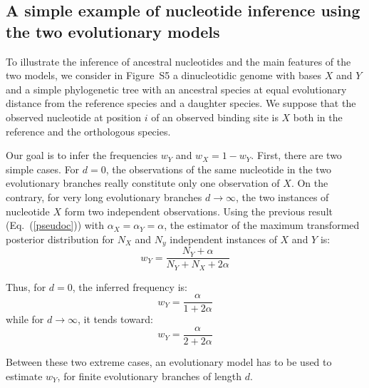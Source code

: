 \documentclass[a4,center,fleqn]{NAR}
\begin{document}
\subsection*{A simple example of nucleotide inference using the two
evolutionary models}
To illustrate the inference of ancestral nucleotides and the main features of
the two models, we consider in Figure~S5
a dinucleotidic genome
with bases $X$ and $Y$ and a simple phylogenetic tree
with an ancestral species at equal evolutionary distance from the reference
species and a daughter species.
We suppose that the observed nucleotide at position $i$ of an observed binding
site is $X$ both in the reference and the orthologous species.

Our goal is to infer the frequencies $w_Y$ and $w_X = 1 - w_Y$.
First, there are two simple cases.
For $d=0$,  the  observations of the same nucleotide in the two evolutionary
branches really constitute only one observation of $X$.
On the contrary, for very long evolutionary branches $d\to \infty$, the two
instances of nucleotide $X$ form two independent observations.   
Using the previous result (Eq.~(\ref{pseudoc})) with
$\alpha_X=\alpha_Y=\alpha$, the estimator of the maximum transformed posterior
distribution for $N_X$ and $N_y$ independent instances of $X$ and $Y$ is:
\begin{equation}
w_Y = \frac{N_Y+\alpha}{N_Y+N_X+2\alpha}
\end{equation}

Thus, for $d=0$,  the inferred frequency is:
\begin{equation}
w_Y = \frac{\alpha}{1+2\alpha}
\end{equation}
while for $d\to \infty$, it tends toward:
\begin{equation}
w_Y = \frac{\alpha}{2+2\alpha}
\end{equation}

Between these two extreme cases, an evolutionary model has to be used to
estimate $w_Y$, for finite evolutionary branches of length $d$.
\end{document}
